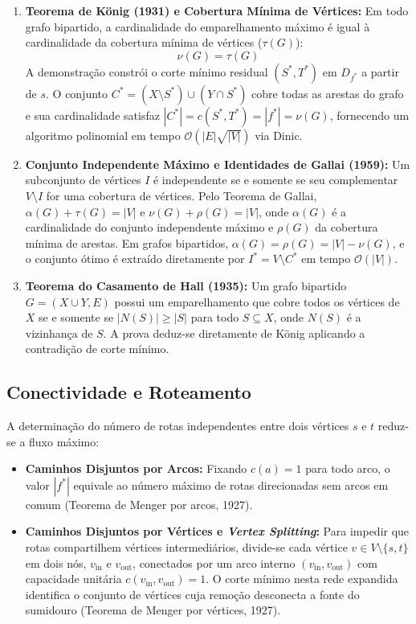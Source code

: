 \documentclass[12pt,a4paper]{article}
\begin{document}
\begin{enumerate}[leftmargin=1.5em, itemsep=0.15em, topsep=0.2em, parsep=0em]
    \item \textbf{Teorema de König (1931) e Cobertura Mínima de Vértices:} Em todo grafo bipartido, a cardinalidade do emparelhamento máximo é igual à cardinalidade da cobertura mínima de vértices ($\tau(G)$):
    \begin{equation}
        \nu(G) = \tau(G)
    \end{equation}
    A demonstração constrói o corte mínimo residual $(S^*, T^*)$ em $D_{f^*}$ a partir de $s$. O conjunto $C^* = (X \setminus S^*) \cup (Y \cap S^*)$ cobre todas as arestas do grafo e sua cardinalidade satisfaz $|C^*| = c(S^*, T^*) = |f^*| = \nu(G)$, fornecendo um algoritmo polinomial em tempo $\mathcal{O}(|E|\sqrt{|V|})$ via Dinic.

    \item \textbf{Conjunto Independente Máximo e Identidades de Gallai (1959):} Um subconjunto de vértices $I$ é independente se e somente se seu complementar $V \setminus I$ for uma cobertura de vértices. Pelo Teorema de Gallai, $\alpha(G) + \tau(G) = |V|$ e $\nu(G) + \rho(G) = |V|$, onde $\alpha(G)$ é a cardinalidade do conjunto independente máximo e $\rho(G)$ da cobertura mínima de arestas. Em grafos bipartidos, $\alpha(G) = \rho(G) = |V| - \nu(G)$, e o conjunto ótimo é extraído diretamente por $I^* = V \setminus C^*$ em tempo $\mathcal{O}(|V|)$.

    \item \textbf{Teorema do Casamento de Hall (1935):} Um grafo bipartido $G = (X \cup Y, E)$ possui um emparelhamento que cobre todos os vértices de $X$ se e somente se $|N(S)| \ge |S|$ para todo $S \subseteq X$, onde $N(S)$ é a vizinhança de $S$. A prova deduz-se diretamente de König aplicando a contradição de corte mínimo.
\end{enumerate}

\subsection{Conectividade e Roteamento}

A determinação do número de rotas independentes entre dois vértices $s$ e $t$ reduz-se a fluxo máximo:
\begin{itemize}[leftmargin=1.5em, itemsep=0.15em, topsep=0.2em, parsep=0em]
    \item \textbf{Caminhos Disjuntos por Arcos:} Fixando $c(a) = 1$ para todo arco, o valor $|f^*|$ equivale ao número máximo de rotas direcionadas sem arcos em comum (Teorema de Menger por arcos, 1927).
    \item \textbf{Caminhos Disjuntos por Vértices e \textit{Vertex Splitting}:} Para impedir que rotas compartilhem vértices intermediários, divide-se cada vértice $v \in V \setminus \{s, t\}$ em dois nós, $v_{\text{in}}$ e $v_{\text{out}}$, conectados por um arco interno $(v_{\text{in}}, v_{\text{out}})$ com capacidade unitária $c(v_{\text{in}}, v_{\text{out}}) = 1$. O corte mínimo nesta rede expandida identifica o conjunto de vértices cuja remoção desconecta a fonte do sumidouro (Teorema de Menger por vértices, 1927).
\end{itemize}
\end{document}
